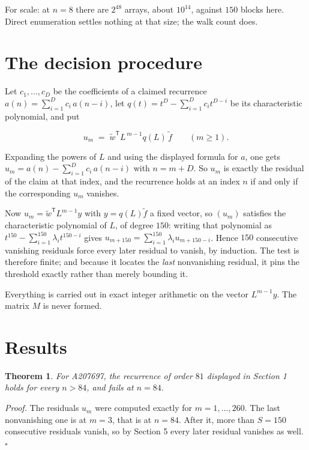 \documentclass[11pt]{article}
\newtheorem{theorem}{Theorem}
\theoremstyle{definition}
\begin{document}
For scale: at $n = 8$ there are $2^{48}$ arrays, about $10^{14}$, against $150$ blocks here. Direct enumeration settles nothing at that size; the walk count does.

\section{The decision procedure}

Let $c_1,\dots,c_D$ be the coefficients of a claimed recurrence $a(n) = \sum_{i=1}^{D} c_i\,a(n-i)$, let $q(t) = t^{D} - \sum_{i=1}^{D} c_i t^{D-i}$ be its characteristic polynomial, and put

\[u_m \;=\; \tilde w^{\mathsf T} L^{\,m-1} q(L)\,\tilde f \qquad (m \ge 1).\]

Expanding the powers of $L$ and using the displayed formula for $a$, one gets $u_m = a(n) - \sum_{i=1}^{D} c_i\,a(n-i)$ with $n = m + D$. So $u_m$ is exactly the residual of the claim at that index, and the recurrence holds at an index $n$ if and only if the corresponding $u_m$ vanishes.

Now $u_m = \tilde w^{\mathsf T} L^{m-1} y$ with $y = q(L)\tilde f$ a fixed vector, so $(u_m)$ satisfies the characteristic polynomial of $L$, of degree $150$: writing that polynomial as $t^{150} - \sum_{i=1}^{150} \lambda_i t^{150-i}$ gives $u_{m+150} = \sum_{i=1}^{150} \lambda_i u_{m+150-i}$. Hence $150$ consecutive vanishing residuals force every later residual to vanish, by induction. The test is therefore finite; and because it locates the {\itshape last} nonvanishing residual, it pins the threshold exactly rather than merely bounding it.

Everything is carried out in exact integer arithmetic on the vector $L^{m-1}y$. The matrix $M$ is never formed.

\section{Results}

\begin{theorem} For A207697, the recurrence of order $81$ displayed in Section 1 holds for every $n > 84$, and fails at $n = 84$.\end{theorem}

{\itshape Proof.} The residuals $u_m$ were computed exactly for $m = 1,\dots,260$. The last nonvanishing one is at $m = 3$, that is at $n = 84$. After it, more than $S = 150$ consecutive residuals vanish, so by Section 5 every later residual vanishes as well. $\square$
\end{document}
